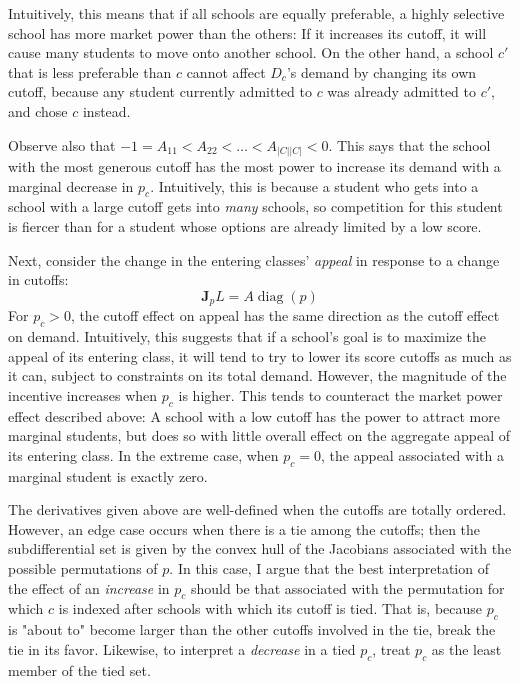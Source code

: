 \documentclass[12pt]{article}
\theoremstyle{definition}
\begin{document}
Intuitively, this means that if all schools are equally preferable, a highly selective school has more market power than the others: If it increases its cutoff, it will cause many students to move onto another school. On the other hand, a school $c'$ that is less preferable than $c$ cannot affect $D_c$'s demand by changing its own cutoff, because any student currently admitted to $c$ was already admitted to $c'$, and chose $c$ instead. 

Observe also that $-1 = A_{11} < A_{22} < \dots < A_{|C||C|} < 0$. This says that the school with the most generous cutoff has the most power to increase its demand with a marginal decrease in $p_c$. Intuitively, this is because a student who gets into a school with a large cutoff gets into \emph{many} schools, so competition for this student is fiercer than for a student whose options are already limited by a low score. 

Next, consider the change in the entering classes' \emph{appeal} in response to a change in cutoffs:
\[\mathbf{J}_p L = A\operatorname{diag}(p)\]
For $p_c > 0$, the cutoff effect on appeal has the same direction as the cutoff effect on demand. Intuitively, this suggests that if a school's goal is to maximize the appeal of its entering class, it will tend to try to lower its score cutoffs as much as it can, subject to constraints on its total demand. However, the magnitude of the incentive increases when $p_c$ is higher. This tends to counteract the market power effect described above: A school with a low cutoff has the power to attract more marginal students, but does so with little overall effect on the aggregate appeal of its entering class. In the extreme case, when $p_c = 0$, the appeal associated with a marginal student is exactly zero.

The derivatives given above are well-defined when the cutoffs are totally ordered. However, an edge case occurs when there is a tie among the cutoffs; then the subdifferential set is given by the convex hull of the Jacobians associated with the possible permutations of $p$. In this case, I argue that the best interpretation of the effect of an \emph{increase} in $p_c$ should be that associated with the permutation for which $c$ is indexed after schools with which its cutoff is tied. That is, because $p_c$ is "about to" become larger than the other cutoffs involved in the tie, break the tie in its favor. Likewise, to interpret a \emph{decrease} in a tied $p_c$, treat $p_c$ as the least member of the tied set.
\end{document}
